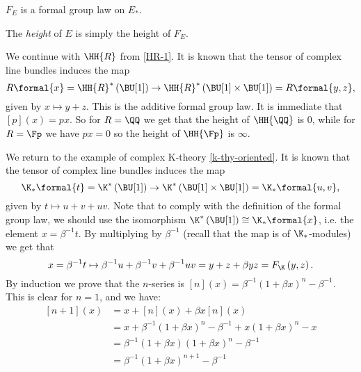 \begin{proposition}
	$F_E$ is a formal group law on $E_*$.
\end{proposition}

\begin{definition}
	The \emph{height} of $E$ is simply the height of $F_E$.
\end{definition}

\begin{example}\label{HR-2}
	We continue with $\HH{R}$ from \ref{HR-1}.
	It is known that the tensor of complex line bundles induces the map
	$$
	R\formal{x}
	= \HH{R}^*\left(\BU[1]\right)
	\to \HH{R}^*\left(\BU[1] \times \BU[1]\right)
	= R\formal{y,z},
	$$
	given by $x \mapsto y + z$.
	This is the additive formal group law.
	It is immediate that $\left[p\right]\left(x\right) = p x$.
	So for $R = \QQ$ we get that the height of $\HH{\QQ}$ is 0, while for $R = \Fp$ we have $p x = 0$ so the height of $\HH{\Fp}$ is $\infty$.
\end{example}

\begin{example}\label{k-thy-fgl}
	We return to the example of complex K-theory \ref{k-thy-oriented}.
	It is known that the tensor of complex line bundles induces the map
	$$
	\K_*\formal{t}
	= \K^*\left(\BU[1]\right)
	\to \K^*\left(\BU[1] \times \BU[1]\right)
	= \K_*\formal{u,v},
	$$
	given by $t \mapsto u + v + u v$.
	Note that to comply with the definition of the formal group law, we should use the isomorphism
	$\K^*\left(\BU[1]\right) \cong \K_* \formal{x}$,
	i.e. the element $x = \beta^{-1	} t$.
	By multiplying by $\beta^{-1}$ (recall that the map is of $\K_*$-modules) we get that
	$$
	x
	= \beta^{-1} t \mapsto \beta^{-1} u + \beta^{-1} v + \beta^{-1} u v
	= y + z + \beta y z
	= F_{\K}\left(y,z\right).
	$$
	By induction we prove that the $n$-series is $\left[n\right]\left(x\right) = \beta^{-1} \left(1 + \beta x\right)^n - \beta^{-1}$.
	This is clear for $n = 1$, and we have:
	\begin{align*}
		\left[n+1\right]\left(x\right)
		&= x + \left[n\right]\left(x\right) + \beta x \left[n\right]\left(x\right)\\
		&= x + \beta^{-1} \left(1 + \beta x\right)^n - \beta^{-1} + x \left(1 + \beta x\right)^n - x\\
		&= \beta^{-1} \left(1 + \beta x\right) \left(1 + \beta x\right)^n - \beta^{-1}\\
		&= \beta^{-1} \left(1 + \beta x\right)^{n+1} - \beta^{-1}
	\end{align*}
\end{example}

